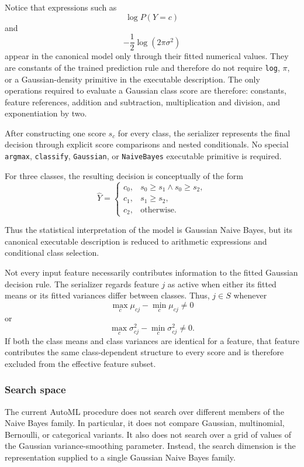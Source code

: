 Notice that expressions such as
\[
\log P(Y=c)
\]
and
\[
-\frac{1}{2}\log(2\pi\sigma^2)
\]
appear in the canonical model only through their fitted numerical values. They are constants of the trained prediction rule and therefore do not require \texttt{log}, $\pi$, or a Gaussian-density primitive in the executable description. The only operations required to evaluate a Gaussian class score are therefore: constants, feature references, addition and subtraction, multiplication and division, and exponentiation by two.

After constructing one score $s_c$ for every class, the serializer represents the final decision through explicit score comparisons and nested conditionals. No special \texttt{argmax}, \texttt{classify}, \texttt{Gaussian}, or \texttt{NaiveBayes} executable primitive is required.

For three classes, the resulting decision is conceptually of the form
\[
\widehat{Y} =
\begin{cases}
c_0, & s_0\geq s_1 \land s_0\geq s_2, \\
c_1, & s_1\geq s_2, \\
c_2, & \text{otherwise}.
\end{cases}
\]

Thus the statistical interpretation of the model is Gaussian Naive Bayes, but its canonical executable description is reduced to arithmetic expressions and conditional class selection.

Not every input feature necessarily contributes information to the fitted Gaussian decision rule. The serializer regards feature $j$ as active when either its fitted means or its fitted variances differ between classes. Thus, $j \in S$ whenever
\[
\max_c \mu_{cj}-\min_c\mu_{cj}\neq0
\]
or
\[
\max_c \sigma_{cj}^{2}-\min_c\sigma_{cj}^{2}\neq0.
\]
If both the class means and class variances are identical for a feature, that feature contributes the same class-dependent structure to every score and is therefore excluded from the effective feature subset.

\subsubsection{Search space}

The current AutoML procedure does not search over different members of the Naive Bayes family. In particular, it does not compare Gaussian, multinomial, Bernoulli, or categorical variants. It also does not search over a grid of values of the Gaussian variance-smoothing parameter. Instead, the search dimension is the representation supplied to a single Gaussian Naive Bayes family.

